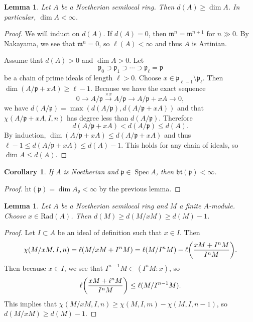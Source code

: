 \documentclass[leqno, openany]{memoir}
\newtheorem{cor}[thm]{Corollary}
\newtheorem{lem}[thm]{Lemma}
\theoremstyle{definition}
\theoremstyle{remark}
\theoremstyle{plain}
\theoremstyle{definition}
\theoremstyle{remark}
\newcommand{\mf}[1]{\mathfrak{#1}}
\newcommand{\mr}[1]{\mathrm{#1}}
\DeclareMathOperator{\Spec}{Spec}
\begin{document}
\begin{lem}
    Let $A$ be a Noetherian semilocal ring. Then $d(A) \geq \dim A$. In particular, $\dim A < \infty$.
\end{lem}

\begin{proof}
    We will induct on $d(A)$. If $d(A) = 0$, then $\mf{m}^n = \mf{m}^{n+1}$ for $n \gg 0$. By Nakayama, we see that $\mf{m}^n = 0$, so $\ell(A) < \infty$ and thus $A$ is Artinian.

    Assume that $d(A) > 0$ and $\dim A > 0$. Let 
    \[ \mf{p}_0 \supset \mf{p}_1 \supset \cdots \supset \mf{p}_{\ell} = \mf{p} \]
    be a chain of prime ideals of length $\ell > 0$. Choose $x \in \mf{p}_{\ell - 1} \setminus \mf{p}_{\ell}$. Then $\dim (A / \mf{p} + xA) \geq \ell - 1$. Because we have the exact sequence
    \[ 0 \to A/\mf{p} \xrightarrow{\times x} A/\mf{p} \to A/\mf{p} + xA \to 0, \]
    we have $d(A/\mf{p}) = \max (d(A/\mf{p}), d(A/\mf{p}+xA))$ and that $ \chi(A/\mf{p}+xA, I,n)$ has degree less than $d(A/\mf{p})$. Therefore
    \[ d(A/\mf{p}+xA) < d(A/\mf{p}) \leq d(A). \]
    By induction, $\dim(A/\mf{p}+xA) \leq d(A/\mf{p}+xA)$ and thus $\ell - 1 \leq d(A/\mf{p}+xA) \leq d(A) - 1$. This holds for any chain of ideals, so $\dim A \leq d(A)$.
\end{proof}

\begin{cor}
    If $A$ is Noetherian and $\mf{p} \in \Spec A$, then $\mf{ht}(\mf{p}) < \infty$.
\end{cor}

\begin{proof}
    $\mr{ht}(\mf{p}) = \dim A_{\mf{p}} < \infty$ by the previous lemma.
\end{proof}

\begin{lem}
    Let $A$ be a Noetherian semilocal ring and $M$ a finite $A$-module. Choose $x \in \mr{Rad}(A)$. Then $d(M) \geq d(M/xM) \geq d(M) - 1$.
\end{lem}

\begin{proof}
    Let $I \subset A$ be an ideal of definition such that $x \in I$. Then
    \[ \chi(M/xM,I,n) = \ell(M/xM + I^nM) = \ell(M / I^nM) - \ell\qty(\frac{xM + I^nM}{I^nM}). \]
    Then because $x \in I$, we see that $I^{n-1}M \subset (I^n M : x)$, so 
    \[ \ell \qty(\frac{xM + i^nM}{I^nM}) \leq \ell(M / I^{n-1}M). \]
    This implies that $\chi(M / xM, I, n) \geq \chi(M, I, m) - \chi(M, I, n-1)$, so $d(M/xM) \geq d(M) - 1$.
\end{proof}
\end{document}
